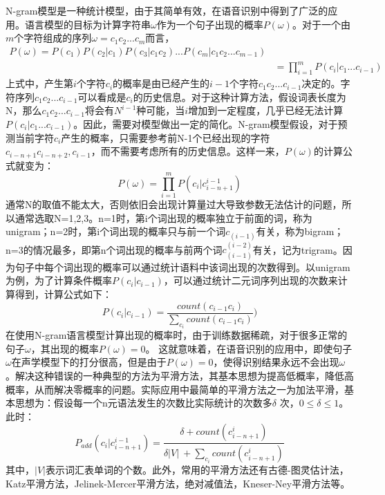 N-gram模型是一种统计模型，由于其简单有效，在语音识别中得到了广泛的应用。语言模型的目标为计算字符串$\omega$作为一个句子出现的概率$P(\omega)$。对于一个由$m$个字符组成的序列$\omega=c_1 c_2...c_m$而言，
\begin{eqnarray}
  P(\omega) = P(c_1)P(c_2|c_1)P(c_3|c_1 c_2)...P(c_m|c_1 c_2...c_{m-1}) \\
          & = \prod\limits_{i=1}^m P(c_i|c_1...c_{i-1})
\end{eqnarray}
上式中，产生第$i$个字符$c_i$的概率是由已经产生的$i-1$个字符$c_1 c_2...c_{i-1}$决定的。字符序列$c_1 c_2...c_{i-1}$可以看成是$c_i$的历史信息。对于这种计算方法，假设词表长度为N，那么$c_1 c_2...c_{i-1}$将会有$N^{i-1}$种可能，当$i$增加到一定程度，几乎已经无法计算$P(c_i|c_1...c_{i-1})$。因此，需要对模型做出一定的简化。N-gram模型假设，对于预测当前字符$c_i$产生的概率，只需要参考前N-1个已经出现的字符$c_{i-n+1} c_{i-n+2}, c_{i-1}$，而不需要考虑所有的历史信息。这样一来，$P(\omega)$的计算公式就变为：
\begin{equation}P(\omega) = \prod\limits_{i=1}^m P(c_i|c_{i-n+1}^{i-1})\end{equation}
通常N的取值不能太大，否则依旧会出现计算量过大导致参数无法估计的问题，所以通常选取N=1,2,3。n=1时，第i个词出现的概率独立于前面的词，称为unigram；n=2时，第i个词出现的概率只与前一个词$c_(i-1)$有关，称为bigram；n=3的情况最多，即第n个词出现的概率与前两个词$c_(i-1)^(i-2)$有关，记为trigram。因为句子中每个词出现的概率可以通过统计语料中该词出现的次数得到。以unigram为例，为了计算条件概率$P(c_i|c_{i-1})$，可以通过统计二元词序列出现的次数来计算得到，计算公式如下：
\begin{equation}P(c_i|c_{i-1})=\frac{count(c_{i-1} c_i)}{\sum\limits_{c_i} count(c_{i-1} c_i)})\end{equation}
在使用N-gram语言模型计算出现的概率时，由于训练数据稀疏，对于很多正常的句子$\omega$，其出现的概率$P(\omega)=0$。 这就意味着，在语音识别的应用中，即使句子$\omega$在声学模型下的打分很高，但是由于$P(\omega)=0$，使得识别结果永远不会出现$\omega$。解决这种错误的一种典型的方法为平滑方法，其基本思想为提高低概率，降低高概率，从而解决零概率的问题。实际应用中最简单的平滑方法之一为加法平滑，基本思想为：假设每一个n元语法发生的次数比实际统计的次数多$\delta$ 次，$0\leqslant \delta \leqslant 1$。此时：
\begin{equation}P_{add}(c_i|c_{i-n+1}^{i-1})=\frac{\delta+count(c_{i-n+1}^{i})}{\delta \lvert V\rvert\ + \sum\limits_{c_i} count(c_{i-n+1}^i)}\end{equation}
其中，$\lvert V\rvert$表示词汇表单词的个数。此外，常用的平滑方法还有古德-图灵估计法，Katz平滑方法，Jelinek-Mercer平滑方法，绝对减值法，Kneser-Ney平滑方法等\cite{goodman2001bit}。


